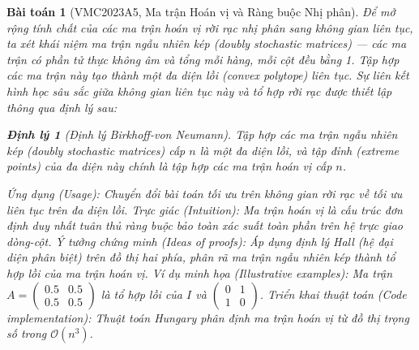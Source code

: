 \documentclass{article}
\newtheorem{baitoan}{Bài toán}
\newtheorem{dinhly}{Định lý}
\begin{document}
\begin{baitoan}[VMC2023A5, Ma trận Hoán vị và Ràng buộc Nhị phân]


Để mở rộng tính chất của các ma trận hoán vị rời rạc nhị phân sang không gian liên tục, ta xét khái niệm ma trận ngẫu nhiên kép (doubly stochastic matrices) --- các ma trận có phần tử thực không âm và tổng mỗi hàng, mỗi cột đều bằng 1. Tập hợp các ma trận này tạo thành một đa diện lồi (convex polytope) liên tục. Sự liên kết hình học sâu sắc giữa không gian liên tục này và tổ hợp rời rạc được thiết lập thông qua định lý sau:

\begin{dinhly}[Định lý Birkhoff-von Neumann]\label{thm:birkhoff_von_neumann}
Tập hợp các ma trận ngẫu nhiên kép (doubly stochastic matrices) cấp $n$ là một đa diện lồi, và tập đỉnh (extreme points) của đa diện này chính là tập hợp các ma trận hoán vị cấp $n$.
\end{dinhly}
\emph{Ứng dụng (Usage):} Chuyển đổi bài toán tối ưu trên không gian rời rạc về tối ưu liên tục trên đa diện lồi.
\emph{Trực giác (Intuition):} Ma trận hoán vị là cấu trúc đơn định duy nhất tuân thủ ràng buộc bảo toàn xác suất toàn phần trên hệ trực giao dòng-cột.
\emph{Ý tưởng chứng minh (Ideas of proofs):} Áp dụng định lý Hall (hệ đại diện phân biệt) trên đồ thị hai phía, phân rã ma trận ngẫu nhiên kép thành tổ hợp lồi của ma trận hoán vị.
\emph{Ví dụ minh họa (Illustrative examples):} Ma trận $A = \begin{pmatrix} 0.5 & 0.5 \\ 0.5 & 0.5 \end{pmatrix}$ là tổ hợp lồi của $I$ và $\begin{pmatrix} 0 & 1 \\ 1 & 0 \end{pmatrix}$.
\emph{Triển khai thuật toán (Code implementation):} Thuật toán Hungary phân định ma trận hoán vị từ đồ thị trọng số trong $\mathcal{O}(n^3)$.


\end{baitoan}
\end{document}
